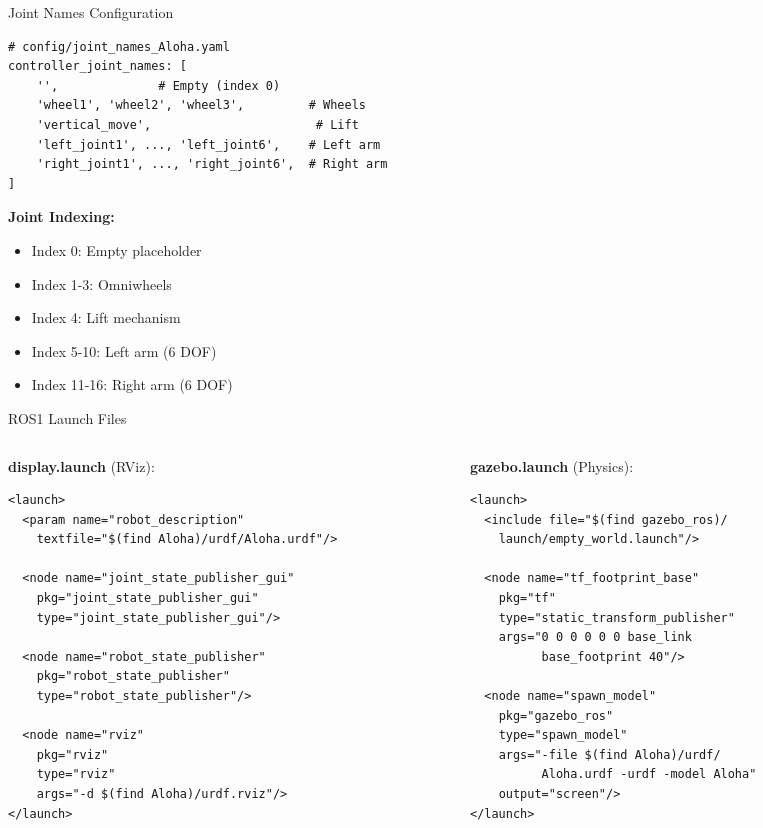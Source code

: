 \begin{frame}[fragile]{Joint Names Configuration}
\begin{lstlisting}[basicstyle=\ttfamily\scriptsize]
# config/joint_names_Aloha.yaml
controller_joint_names: [
    '',              # Empty (index 0)
    'wheel1', 'wheel2', 'wheel3',         # Wheels
    'vertical_move',                       # Lift
    'left_joint1', ..., 'left_joint6',    # Left arm
    'right_joint1', ..., 'right_joint6',  # Right arm
]
\end{lstlisting}

\vspace{0.3cm}

\textbf{Joint Indexing:}
\begin{itemize}
    \item Index 0: Empty placeholder
    \item Index 1-3: Omniwheels
    \item Index 4: Lift mechanism
    \item Index 5-10: Left arm (6 DOF)
    \item Index 11-16: Right arm (6 DOF)
\end{itemize}
\end{frame}

\begin{frame}[fragile]{ROS1 Launch Files}
\begin{columns}
\begin{column}{0.5\textwidth}
\textbf{display.launch} (RViz):
\begin{lstlisting}
<launch>
  <param name="robot_description"
    textfile="$(find Aloha)/urdf/Aloha.urdf"/>

  <node name="joint_state_publisher_gui"
    pkg="joint_state_publisher_gui"
    type="joint_state_publisher_gui"/>

  <node name="robot_state_publisher"
    pkg="robot_state_publisher"
    type="robot_state_publisher"/>

  <node name="rviz"
    pkg="rviz"
    type="rviz"
    args="-d $(find Aloha)/urdf.rviz"/>
</launch>
\end{lstlisting}
\end{column}
\begin{column}{0.5\textwidth}
\textbf{gazebo.launch} (Physics):
\begin{lstlisting}
<launch>
  <include file="$(find gazebo_ros)/
    launch/empty_world.launch"/>

  <node name="tf_footprint_base"
    pkg="tf"
    type="static_transform_publisher"
    args="0 0 0 0 0 0 base_link
          base_footprint 40"/>

  <node name="spawn_model"
    pkg="gazebo_ros"
    type="spawn_model"
    args="-file $(find Aloha)/urdf/
          Aloha.urdf -urdf -model Aloha"
    output="screen"/>
</launch>
\end{lstlisting}
\end{column}
\end{columns}
\end{frame}

